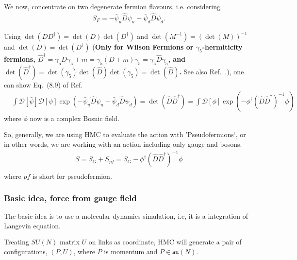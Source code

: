 We now, concentrate on two degenerate fermion flavours. i.e. considering
\begin{equation}
\begin{split}
&S_F=-\bar{\psi}_u \hat{D} \psi _u-\bar{\psi}_d \hat{D} \psi _d.
\end{split}
\end{equation}

Using $\det (DD^{\dagger})=\det (D)\det (D^{\dagger})$ and $\det(M^{-1})=\left(\det (M)\right)^{-1}$ and \textcolor[rgb]{1,0,0}{$\det (D)=\det (D^{\dagger})$} (\textbf{Only for Wilson Fermions or $\gamma _5$-hermiticity fermions, $\hat{D}^{\dagger}=\gamma _5 D \gamma _5 + m=\gamma _5 (D+m) \gamma _5=\gamma _5 \hat{D} \gamma _5$, and $\det(\hat{D}^{\dagger})=\det(\gamma _5)\det(\hat{D})\det(\gamma _5)=\det (\hat{D})$.} See also Ref.~\cite{weingarten1981}.), one can show Eq.~(8.9) of Ref.~\cite{latticeqcdbook2010}
\begin{equation}
\begin{split}
&\int \mathcal{D}[\bar{\psi}]\mathcal{D}[\psi]\exp\left(-\bar{\psi}_u \hat{D} \psi _u-\bar{\psi}_d \hat{D} \psi _d\right)=\det (\hat{D}\hat{D}^{\dagger})=\int \mathcal{D}[\phi] \exp (-\phi ^{\dagger}\left(\hat{D}\hat{D}^{\dagger}\right)^{-1} \phi)
\end{split}
\end{equation}
where $\phi$ now is a complex Bosnic field.

So, generally, we are using HMC to evaluate the action with 'Pseudofermions`, or in other words, we are working with an action including only gauge and bosons.
\begin{equation}
\begin{split}
&S=S_G+S_{pf}=S_G-\phi ^{\dagger}\left(\hat{D}\hat{D}^{\dagger}\right)^{-1} \phi\\
\end{split}
\end{equation}
where $pf$ is short for pseudofermion.

\subsubsection{\label{hmc_scheme}Basic idea, force from gauge field}

The basic idea is to use a molecular dynamics simulation, i.e, it is a integration of Langevin equation.

Treating $SU(N)$ matrix $U$ on links as coordinate, HMC will generate a pair of configurations, $(P,U)$, where $P$ is momentum and $P\in \mathfrak{su}(N)$.

